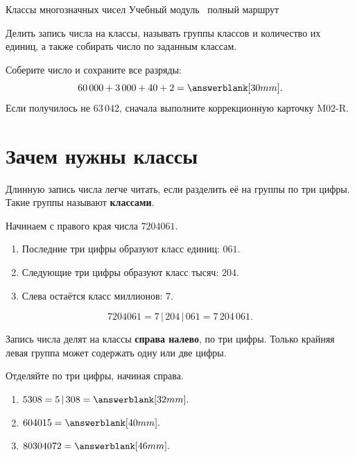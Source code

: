 \worksheettitle
  {Классы многозначных чисел}
  { Учебный модуль \textbullet\ полный маршрут}

\studentnameblock

\begin{notebox}
  Делить запись числа на классы, называть группы классов и количество их
  единиц, а также собирать число по заданным классам.
\end{notebox}

\begin{checkpointbox}
  Соберите число и сохраните все разряды:
  \[
    60\,000+3\,000+40+2=\answerblank[30mm].
  \]
  Если получилось не \(63\,042\), сначала выполните коррекционную карточку
  M02-R.
\end{checkpointbox}

\section{Зачем нужны классы}

Длинную запись числа легче читать, если разделить её на группы по три цифры.
Такие группы называют \textbf{классами}.

\begin{problembox}
  Начинаем с правого края числа \(7204061\).
  \begin{enumerate}[label=\textbf{Шаг \arabic*.}, leftmargin=*]
    \item Последние три цифры образуют класс единиц: \(061\).
    \item Следующие три цифры образуют класс тысяч: \(204\).
    \item Слева остаётся класс миллионов: \(7\).
  \end{enumerate}
  \[
    7204061=7\,|\,204\,|\,061=7\,204\,061.
  \]
\end{problembox}

\begin{reflectionbox}[Правило]
  Запись числа делят на классы \textbf{справа налево}, по три цифры.
  Только крайняя левая группа может содержать одну или две цифры.
\end{reflectionbox}

\newpage
\begin{practicebox}
  Отделяйте по три цифры, начиная справа.
  \begin{enumerate}[label=\textbf{\arabic*.}]
    \item \(5308=5\,|\,308=\answerblank[32mm].\)
    \item \(604015=\answerblank[40mm].\)
    \item \(80304072=\answerblank[46mm].\)
  \end{enumerate}
\end{practicebox}

